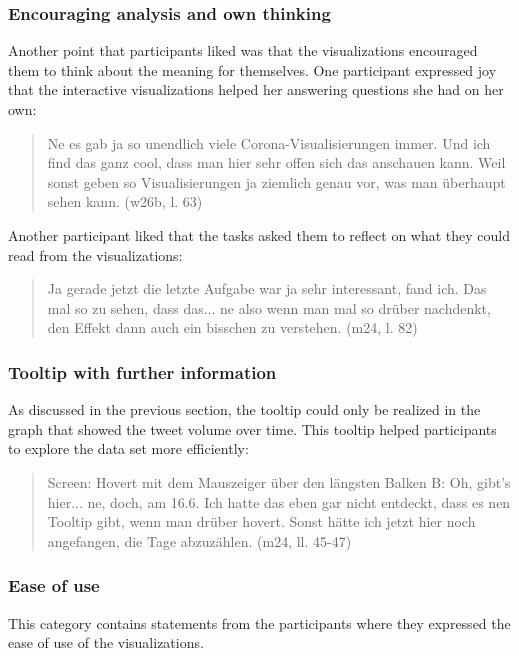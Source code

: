 \subsubsection*{Encouraging analysis and own thinking}
Another point that participants liked was that the visualizations encouraged them to think about the meaning for themselves. One participant expressed joy that the interactive visualizations helped her answering questions she had on her own:

\begin{quote}
    Ne es gab ja so unendlich viele Corona-Visualisierungen immer. Und ich find das ganz cool, dass man hier sehr offen sich das anschauen kann. Weil sonst geben so Visualisierungen ja ziemlich genau vor, was man überhaupt sehen kann. (w26b, l. 63)
\end{quote}

Another participant liked that the tasks asked them to reflect on what they could read from the visualizations:

\begin{quote}
    Ja gerade jetzt die letzte Aufgabe war ja sehr interessant, fand ich. Das mal so zu sehen, dass das... ne also wenn man mal so drüber nachdenkt, den Effekt dann auch ein bisschen zu verstehen. (m24, l. 82)
\end{quote}

\subsubsection*{Tooltip with further information}
As discussed in the previous section, the tooltip could only be realized in the graph that showed the tweet volume over time. This tooltip helped participants to explore the data set more efficiently:

\begin{quote}
    Screen: Hovert mit dem Mauszeiger über den längsten Balken
    B: Oh, gibt's hier... ne, doch, am 16.6. Ich hatte das eben gar nicht entdeckt, dass es nen Tooltip gibt, wenn man drüber hovert. Sonst hätte ich jetzt hier noch angefangen, die Tage abzuzählen. (m24, ll. 45-47)
\end{quote}

\subsubsection*{Ease of use}
This category contains statements from the participants where they expressed the ease of use of the visualizations.

